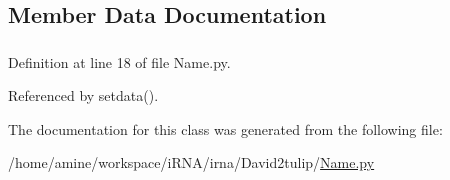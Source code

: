\subsection{\-Member \-Data \-Documentation}
\hypertarget{classirna_1_1David2tulip_1_1Name_1_1Name_abd1d009c76fa4115090bc0ac89e0716c}{
\subsubsection[{name\-\_\-file}]{}}
\label{classirna_1_1David2tulip_1_1Name_1_1Name_abd1d009c76fa4115090bc0ac89e0716c}


\-Definition at line 18 of file \-Name.\-py.



\-Referenced by setdata().



\-The documentation for this class was generated from the following file\-:\begin{DoxyCompactItemize}
\item 
/home/amine/workspace/i\-R\-N\-A/irna/\-David2tulip/\hyperlink{Name_8py}{\-Name.\-py}\end{DoxyCompactItemize}
